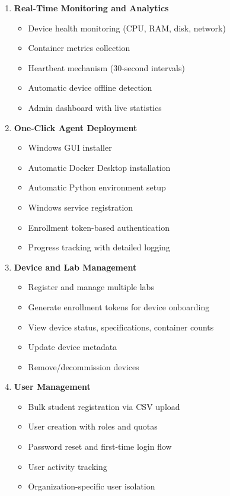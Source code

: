 \documentclass[12pt,a4paper]{article}
\begin{document}
\begin{enumerate}[noitemsep]
    \item \textbf{Real-Time Monitoring and Analytics}
    \begin{itemize}[noitemsep]
        \item Device health monitoring (CPU, RAM, disk, network)
        \item Container metrics collection
        \item Heartbeat mechanism (30-second intervals)
        \item Automatic device offline detection
        \item Admin dashboard with live statistics
    \end{itemize}
    
    \item \textbf{One-Click Agent Deployment}
    \begin{itemize}[noitemsep]
        \item Windows GUI installer
        \item Automatic Docker Desktop installation
        \item Automatic Python environment setup
        \item Windows service registration
        \item Enrollment token-based authentication
        \item Progress tracking with detailed logging
    \end{itemize}
    
    \item \textbf{Device and Lab Management}
    \begin{itemize}[noitemsep]
        \item Register and manage multiple labs
        \item Generate enrollment tokens for device onboarding
        \item View device status, specifications, container counts
        \item Update device metadata
        \item Remove/decommission devices
    \end{itemize}
    
    \item \textbf{User Management}
    \begin{itemize}[noitemsep]
        \item Bulk student registration via CSV upload
        \item User creation with roles and quotas
        \item Password reset and first-time login flow
        \item User activity tracking
        \item Organization-specific user isolation
    \end{itemize}
\end{enumerate}
\end{document}

